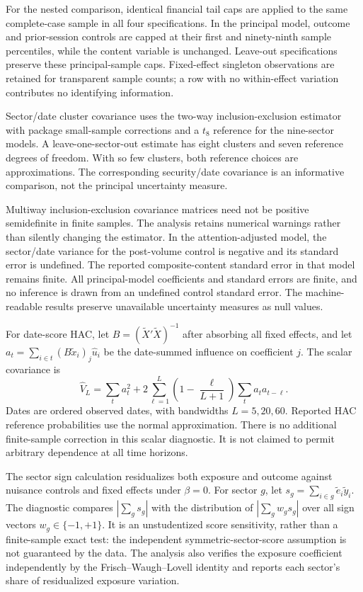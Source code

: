 \documentclass[11pt,a4paper]{article}
\begin{document}
For the nested comparison, identical financial tail caps are applied to the same complete-case sample in all four specifications. In the principal model, outcome and prior-session controls are capped at their first and ninety-ninth sample percentiles, while the content variable is unchanged. Leave-out specifications preserve these principal-sample caps. Fixed-effect singleton observations are retained for transparent sample counts; a row with no within-effect variation contributes no identifying information.

Sector/date cluster covariance uses the two-way inclusion-exclusion estimator with package small-sample corrections and a $t_{8}$ reference for the nine-sector models. A leave-one-sector-out estimate has eight clusters and seven reference degrees of freedom. With so few clusters, both reference choices are approximations. The corresponding security/date covariance is an informative comparison, not the principal uncertainty measure.

Multiway inclusion-exclusion covariance matrices need not be positive semidefinite in finite samples. The analysis retains numerical warnings rather than silently changing the estimator. In the attention-adjusted model, the sector/date variance for the post-volume control is negative and its standard error is undefined. The reported composite-content standard error in that model remains finite. All principal-model coefficients and standard errors are finite, and no inference is drawn from an undefined control standard error. The machine-readable results preserve unavailable uncertainty measures as null values.

For date-score HAC, let $B=(\widetilde X'\widetilde X)^{-1}$ after absorbing all fixed effects, and let $a_t=\sum_{i\in t}(B\widetilde x_i)_j\hat u_i$ be the date-summed influence on coefficient $j$. The scalar covariance is
\begin{equation}
 \widehat V_L=\sum_t a_t^2+2\sum_{\ell=1}^{L}\left(1-\frac{\ell}{L+1}\right)
                              \sum_t a_ta_{t-\ell}.
\end{equation}
Dates are ordered observed dates, with bandwidths $L=5,20,60$. Reported HAC reference probabilities use the normal approximation. There is no additional finite-sample correction in this scalar diagnostic. It is not claimed to permit arbitrary dependence at all time horizons.

The sector sign calculation residualizes both exposure and outcome against nuisance controls and fixed effects under $\beta=0$. For sector $g$, let $s_g=\sum_{i\in g}\widetilde e_i\widetilde y_i$. The diagnostic compares $|\sum_gs_g|$ with the distribution of $|\sum_gw_gs_g|$ over all sign vectors $w_g\in\{-1,+1\}$. It is an unstudentized score sensitivity, rather than a finite-sample exact test: the independent symmetric-sector-score assumption is not guaranteed by the data. The analysis also verifies the exposure coefficient independently by the Frisch--Waugh--Lovell identity and reports each sector's share of residualized exposure variation.
\end{document}
